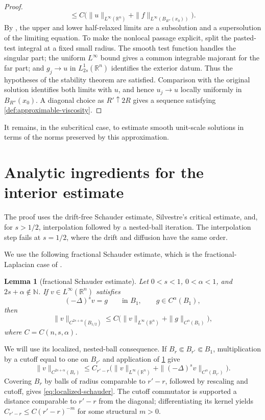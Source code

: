 \documentclass[reqno]{amsart}
\numberwithin{equation}{section}
\theoremstyle{plain}
\newtheorem{lemma}[theorem]{Lemma}
\theoremstyle{definition}
\theoremstyle{remark}
\newcommand{\R}{\mathbb R}
\newcommand{\rev}[1]{#1}
\begin{document}
\begin{proof}
\[ \le C\bigl(\|u\|_{L^\infty(\R^n)}+
             \|f\|_{L^\infty(B_{R''}(x_0))}\bigr).
\]
By \cite[Theorem~1]{BarlesImbert2008}, the upper and lower half-relaxed
limits are a subsolution and a supersolution of the limiting equation.  To
make the nonlocal passage explicit, split the pasted-test integral at a fixed
small radius.  The smooth test function handles the singular part; the
uniform $L^\infty$ bound gives a common integrable majorant for the far part;
and $g_j\to u$ in $L^1_{2s}(\R^n)$ identifies the exterior datum.  Thus the
hypotheses of the stability theorem are satisfied.  Comparison with the
original solution identifies both limits with $u$, and hence
$u_j\to u$ locally uniformly in $B_{R''}(x_0)$.
A diagonal choice as $R'\uparrow2R$ gives a sequence satisfying
\cref{def:approximable-viscosity}.
\endgroup
\end{proof}

\rev{It remains, in the subcritical case, to estimate smooth unit-scale
solutions in terms of the norms preserved by this approximation.}

\section{Analytic ingredients for the interior estimate}\label{sec:estimates}

\rev{The proof uses the drift-free Schauder estimate, Silvestre's critical
estimate, and, for $s>1/2$, interpolation followed by a nested-ball
iteration.  The interpolation step fails at $s=1/2$, where the drift and
diffusion have the same order.}

We use the following fractional Schauder estimate, which is the
fractional-Laplacian case of
\cite[Corollary~3.5]{RosOtonSerra2016}.

\begin{lemma}[fractional Schauder estimate]\label{lem:fractional-schauder}
Let $0<s<1$, $0<\alpha<1$, and $2s+\alpha\notin\mathbb N$.  If
$v\in L^\infty(\R^n)$ satisfies
\[
 (-\Delta)^s v=g\qquad\text{in }B_1,
 \qquad g\in C^\alpha(B_1),
\]
then
\begin{equation}\label{eq:pure-schauder}
 \|v\|_{C^{2s+\alpha}(B_{1/2})}
 \le C\bigl(\|v\|_{L^\infty(\R^n)}
             +\|g\|_{C^\alpha(B_1)}\bigr),
\end{equation}
where $C=C(n,s,\alpha)$.
\end{lemma}

We will use its localized, nested-ball consequence.  If
$B_r\Subset B_{r'}\Subset B_1$, multiplication by a cutoff equal to one on
$B_{r'}$ and application of \cref{lem:fractional-schauder} give
\begin{equation}\label{eq:localized-schauder}
 \|v\|_{C^{2s+\alpha}(B_r)}
 \le C_{r'-r}\bigl(
 \|v\|_{L^\infty(\R^n)}
 +\|(-\Delta)^sv\|_{C^\alpha(B_{r'})}\bigr).
\end{equation}
\rev{Covering $B_r$ by balls of radius comparable to $r'-r$, followed by
rescaling and cutoff, gives \eqref{eq:localized-schauder}.  The cutoff
commutator is supported a distance comparable to $r'-r$ from the diagonal;
differentiating its kernel yields
$C_{r'-r}\le C(r'-r)^{-m}$ for some structural $m>0$.}
\end{document}
